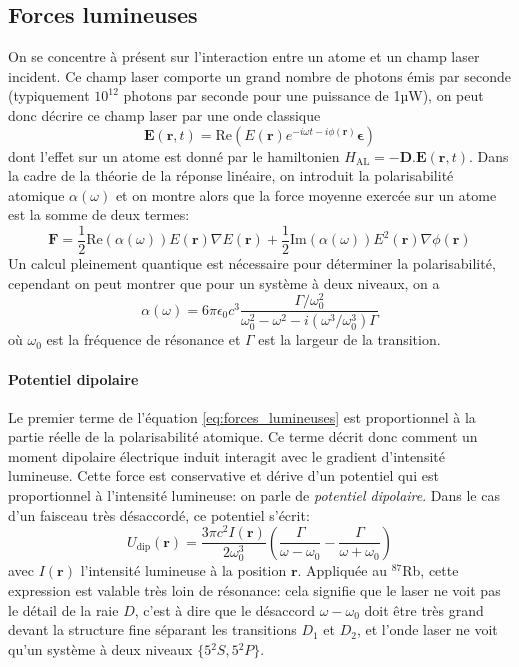 \subsection{Forces lumineuses}
\label{sc:forces_lumineuses}
On se concentre à présent sur l'interaction entre un atome et un champ laser incident. Ce champ laser comporte un grand nombre de photons émis par seconde (typiquement $10^{12}$ photons par seconde pour une puissance de 1µW), on peut donc décrire ce champ laser par une onde classique 
\begin{equation}
\mathbf{E}(\mathbf{r},t)= \mathrm{Re} \left( E(\mathbf{r}) e^{-i \omega t - i\phi (\mathbf{r})}  \boldsymbol\epsilon \right)
\end{equation}
dont l'effet sur un atome est donné par le hamiltonien $H_{\mathrm{AL}}=-\mathbf{D}.\mathbf{E}(\mathbf{r},t)$. 
Dans la cadre de la théorie de la réponse linéaire, on introduit la polarisabilité atomique $\alpha(\omega)$ et on montre alors que la force moyenne exercée sur un atome est la somme de deux termes:
\begin{equation}
\mathbf{F}=\frac{1}{2} \mathrm{Re}(\alpha(\omega)) E(\mathbf{r}) \nabla E(\mathbf{r})+\frac{1}{2}\mathrm{Im}(\alpha(\omega)) E^2(\mathbf{r}) \nabla \phi(\mathbf{r})
\label{eq:forces_lumineuses}
\end{equation}
Un calcul pleinement quantique est nécessaire pour déterminer la polarisabilité, cependant on peut montrer que pour un système à deux niveaux, on a \citep{grimm1999optical}
\begin{equation}
\alpha(\omega)=6 \pi \epsilon_0 c^3 \frac{\Gamma / \omega_0^2}{\omega_0^2 -\omega^2 -i(\omega^3/\omega_0^3)\Gamma}
\end{equation}
où $\omega_0$ est la fréquence de résonance et $\Gamma$ est la largeur de la transition.

\paragraph*{Potentiel dipolaire}
Le premier terme de l'équation \ref{eq:forces_lumineuses} est proportionnel à la partie réelle de la polarisabilité atomique. Ce terme décrit donc comment un moment dipolaire électrique induit interagit avec le gradient d'intensité lumineuse. Cette force est conservative et dérive d'un potentiel qui est proportionnel à l'intensité lumineuse: on parle de \emph{potentiel dipolaire}. Dans le cas d'un faisceau très désaccordé, ce potentiel s'écrit:
\begin{equation}
U_{\mathrm{dip}}(\mathbf{r})=\frac{3\pi c^2 I(\mathbf{r})}{2 \omega_0^3} \left( \frac{\Gamma}{\omega - \omega_0} - \frac{\Gamma}{\omega + \omega_0} \right)
\label{eq:potentiel_dipolaire}
\end{equation}
avec $I(\mathbf{r})$ l'intensité lumineuse à la position $\mathbf{r}$. Appliquée au ${}^{87}$Rb, cette expression est valable très loin de résonance: cela signifie que le laser ne voit pas le détail de la raie $D$, c'est à dire que le désaccord $\omega-\omega_0$ doit être très grand devant la structure fine séparant les transitions $D_1$ et $D_2$, et l'onde laser ne voit qu'un système à deux niveaux $\lbrace 5 {}^2S, 5 {}^2P \rbrace$.

